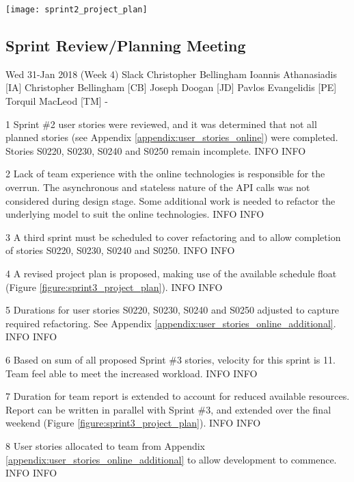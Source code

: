 \begin{center}
	\texttt{[image: sprint2\_project\_plan]}
	\label{figure:sprint2_project_plan}
\end{center}


\newpage
\subsection{Sprint Review/Planning Meeting}
\label{appendix:sprint3_planning_meeting}

\momtoptable
{Wed 31-Jan 2018 (Week 4)}
{Slack}
{Christopher Bellingham}
{Ioannis Athanasiadis [IA]\newline
Christopher Bellingham [CB]\newline
Joseph Doogan [JD]\newline
Pavlos Evangelidis [PE]\newline
Torquil MacLeod [TM]}
{-}

\begin{momitems}
	\momitem
	{1}
	{Sprint \#2 user stories were reviewed, and it was determined that not all planned stories (see Appendix \ref{appendix:user_stories_online}) were completed. Stories S0220, S0230, S0240 and S0250 remain incomplete.}
	{INFO}
	{INFO}

	\momitem
	{2}
	{Lack of team experience with the online technologies is responsible for the overrun. 
	The asynchronous and stateless nature of the API calls was not considered during design stage. Some additional work is needed to refactor the underlying model to suit the online technologies.}
	{INFO}
	{INFO}

	\momitem
	{3}
	{A third sprint must be scheduled to cover refactoring and to allow completion of stories S0220, S0230, S0240 and S0250.}
	{INFO}
	{INFO}

	\momitem
	{4}
	{A revised project plan is proposed, making use of the available schedule float (Figure \ref{figure:sprint3_project_plan}).}
	{INFO}
	{INFO}

	\momitem
	{5}
	{Durations for user stories S0220, S0230, S0240 and S0250 adjusted to capture required refactoring.
	See Appendix \ref{appendix:user_stories_online_additional}.}
	{INFO}
	{INFO}

	\momitem
	{6}
	{Based on sum of all proposed Sprint \#3 stories, velocity for this sprint is 11.
	Team feel able to meet the increased workload.}
	{INFO}
	{INFO}

	\momitem
	{7}
	{Duration for team report is extended to account for reduced available resources.
	Report can be written in parallel with Sprint \#3, and extended over the final weekend (Figure \ref{figure:sprint3_project_plan}).}
	{INFO}
	{INFO}

	\momitem
	{8}
	{User stories allocated to team from Appendix \ref{appendix:user_stories_online_additional} to allow development to commence.}
	{INFO}
	{INFO}
\end{momitems}

